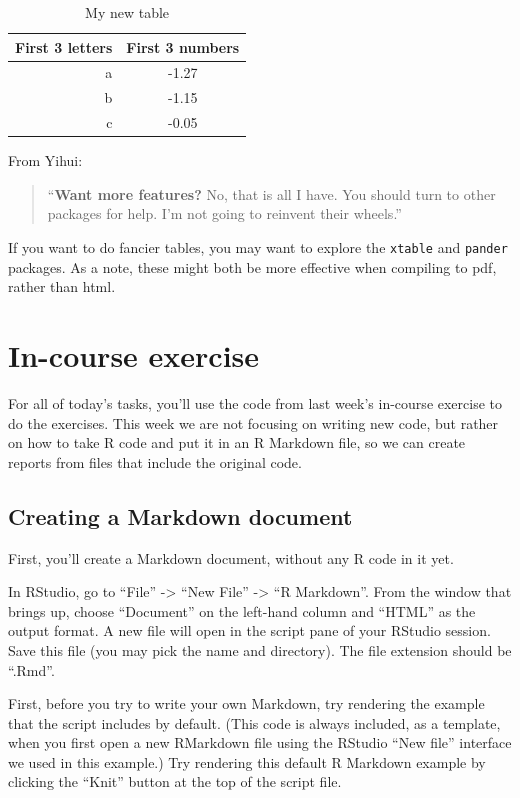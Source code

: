 \documentclass[]{book}
\theoremstyle{definition}
\theoremstyle{definition}
\theoremstyle{definition}
\theoremstyle{remark}
\begin{document}
\begin{table}

\caption{\label{tab:unnamed-chunk-314}My new table}
\centering
\begin{tabular}[t]{r|c}
\hline
First 3 letters & First 3 numbers\\
\hline
a & -1.27\\
\hline
b & -1.15\\
\hline
c & -0.05\\
\hline
\end{tabular}
\end{table}

From Yihui:

\begin{quote}
``\textbf{Want more features?} No, that is all I have. You should turn
to other packages for help. I'm not going to reinvent their wheels.''
\end{quote}

If you want to do fancier tables, you may want to explore the
\texttt{xtable} and \texttt{pander} packages. As a note, these might
both be more effective when compiling to pdf, rather than html.

\section{In-course exercise}\label{in-course-exercise-4}

For all of today's tasks, you'll use the code from last week's in-course
exercise to do the exercises. This week we are not focusing on writing
new code, but rather on how to take R code and put it in an R Markdown
file, so we can create reports from files that include the original
code.

\subsection{Creating a Markdown
document}\label{creating-a-markdown-document}

First, you'll create a Markdown document, without any R code in it yet.

In RStudio, go to ``File'' -\textgreater{} ``New File'' -\textgreater{}
``R Markdown''. From the window that brings up, choose ``Document'' on
the left-hand column and ``HTML'' as the output format. A new file will
open in the script pane of your RStudio session. Save this file (you may
pick the name and directory). The file extension should be ``.Rmd''.

First, before you try to write your own Markdown, try rendering the
example that the script includes by default. (This code is always
included, as a template, when you first open a new RMarkdown file using
the RStudio ``New file'' interface we used in this example.) Try
rendering this default R Markdown example by clicking the ``Knit''
button at the top of the script file.
\end{document}
